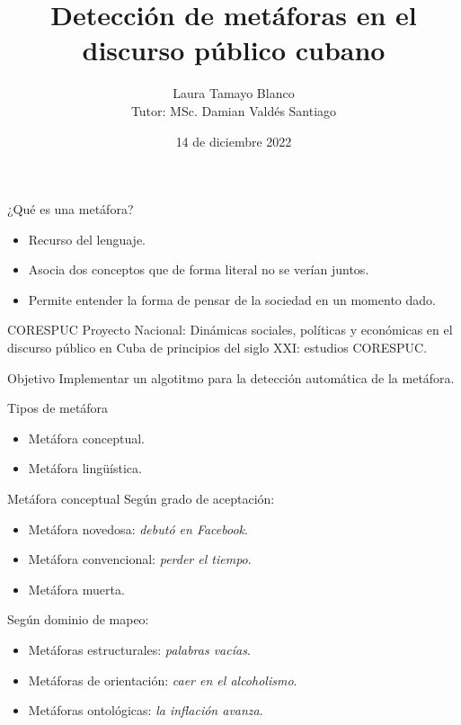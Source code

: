 \documentclass[12pt]{beamer}
\author[Laura Tamayo Blanco]{Laura Tamayo Blanco\\Tutor: MSc. Damian Valdés Santiago}
\title{Detección de metáforas en el discurso público cubano}
\date{14 de diciembre 2022}
\begin{document}
\begin{frame}
\titlepage
\end{frame}

\begin{frame}{¿Qué es una metáfora?}
\begin{itemize}
\item Recurso del lenguaje.
\item Asocia dos conceptos que de forma literal no se verían juntos.
\item Permite entender la forma de pensar de la sociedad en un momento dado.
\end{itemize}
\end{frame}


\begin{frame}{CORESPUC}
Proyecto Nacional: Dinámicas sociales, políticas y económicas en el discurso público en Cuba de principios del siglo XXI: estudios CORESPUC. \\
\end{frame}

\begin{frame}{Objetivo}
Implementar un algotitmo para la detección automática de la metáfora.
\end{frame}
\begin{frame}{Tipos de metáfora}
\begin{itemize}
\item Metáfora conceptual.
\item Metáfora lingüística.
\end{itemize}
\end{frame}

\begin{frame}{Metáfora conceptual}
Según grado de aceptación:
\begin{itemize}
\item Metáfora novedosa: \textit{debutó en Facebook}.
\item Metáfora convencional:  \textit{perder el tiempo}.
\item Metáfora muerta.
\end{itemize}
Según dominio de mapeo:
\begin{itemize}
\item Metáforas estructurales: \textit{palabras vacías}.
\item Metáforas de orientación:  \textit{caer en el alcoholismo}.
\item Metáforas ontológicas: \textit{la inflación avanza}.
\end{itemize}
\end{frame}
\end{document}
